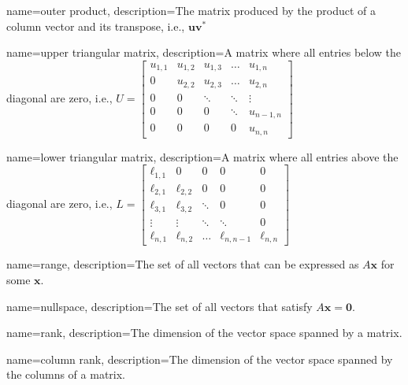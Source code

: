 \makeglossaries
 
{
        name=outer product,
        description={The matrix produced by the product of a column vector and its transpose, i.e., \(\mathbf{u}\mathbf{v}^*\)}
}
 
{
        name=upper triangular matrix,
        description={A matrix where all entries below the diagonal are zero, i.e., \(U = \begin{bmatrix}
                u_{1,1} & u_{1,2} & u_{1,3} & \ldots &   u_{1,n} \\
                      0 & u_{2,2} & u_{2,3} & \ldots &   u_{2,n} \\
                      0 & 0       &  \ddots & \ddots &    \vdots \\
                      0 & 0       & 0       & \ddots & u_{n-1,n} \\
                      0 & 0       & 0       & 0      &   u_{n,n}
              \end{bmatrix}\)}
}
 
{
        name=lower triangular matrix,
        description={A matrix where all entries above the diagonal are zero, i.e., \(L = \begin{bmatrix}
                \ell_{1,1} &  0         & 0      & 0            &          0 \\
                \ell_{2,1} & \ell_{2,2} & 0      & 0            &          0 \\
                \ell_{3,1} & \ell_{3,2} & \ddots & 0            &          0 \\
                    \vdots &     \vdots & \ddots &       \ddots &          0 \\
                \ell_{n,1} & \ell_{n,2} & \ldots & \ell_{n,n-1} & \ell_{n,n}
              \end{bmatrix}\)}
}
 
{
        name=range,
        description={The set of all vectors that can be expressed as \(A\mathbf{x}\) for some \(\mathbf{x}\).}
}

{
        name=nullspace,
        description={The set of all vectors that satisfy \(A\mathbf{x}=\mathbf{0}\).}
}

{
        name=rank,
        description={The dimension of the vector space spanned by a matrix.}
}

{
        name=column rank,
        description={The dimension of the vector space spanned by the columns of a matrix.}
}

